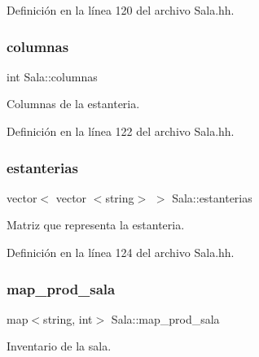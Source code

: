 Definición en la línea 120 del archivo Sala.\+hh.

\mbox{\label{class_sala_af3c278931f26e28e77fa363e9be82000}} 
\subsubsection{\texorpdfstring{columnas}{columnas}}
{\footnotesize\ttfamily int Sala\+::columnas\hspace{0.3cm}{\ttfamily [private]}}



Columnas de la estanteria. 



Definición en la línea 122 del archivo Sala.\+hh.

\mbox{\label{class_sala_a88aae17b7e590770fe8115b41da2e26a}} 
\subsubsection{\texorpdfstring{estanterias}{estanterias}}
{\footnotesize\ttfamily vector$<$ vector $<$string$>$ $>$ Sala\+::estanterias\hspace{0.3cm}{\ttfamily [private]}}



Matriz que representa la estanteria. 



Definición en la línea 124 del archivo Sala.\+hh.

\mbox{\label{class_sala_a1ee09851cf1735dc48ab69a91952e250}} 
\subsubsection{\texorpdfstring{map\+\_\+prod\+\_\+sala}{map\_prod\_sala}}
{\footnotesize\ttfamily map$<$string, int$>$ Sala\+::map\+\_\+prod\+\_\+sala\hspace{0.3cm}{\ttfamily [private]}}



Inventario de la sala. 



